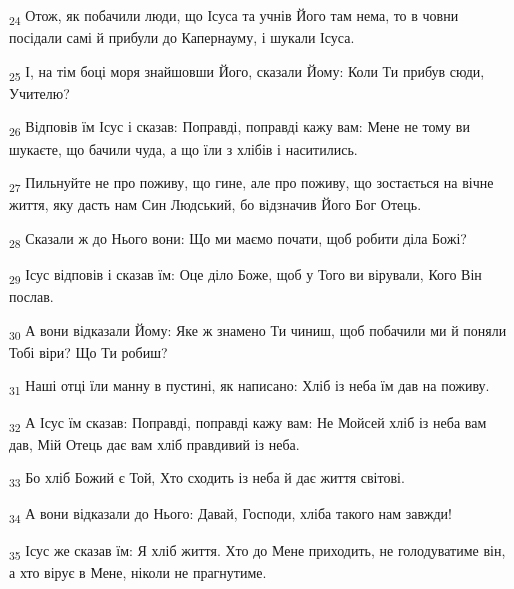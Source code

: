 \begin{tcolorbox}
\textsubscript{24} Отож, як побачили люди, що Ісуса та учнів Його там нема, то в човни посідали самі й прибули до Капернауму, і шукали Ісуса.
\end{tcolorbox}
\begin{tcolorbox}
\textsubscript{25} І, на тім боці моря знайшовши Його, сказали Йому: Коли Ти прибув сюди, Учителю?
\end{tcolorbox}
\begin{tcolorbox}
\textsubscript{26} Відповів їм Ісус і сказав: Поправді, поправді кажу вам: Мене не тому ви шукаєте, що бачили чуда, а що їли з хлібів і наситились.
\end{tcolorbox}
\begin{tcolorbox}
\textsubscript{27} Пильнуйте не про поживу, що гине, але про поживу, що зостається на вічне життя, яку дасть нам Син Людський, бо відзначив Його Бог Отець.
\end{tcolorbox}
\begin{tcolorbox}
\textsubscript{28} Сказали ж до Нього вони: Що ми маємо почати, щоб робити діла Божі?
\end{tcolorbox}
\begin{tcolorbox}
\textsubscript{29} Ісус відповів і сказав їм: Оце діло Боже, щоб у Того ви вірували, Кого Він послав.
\end{tcolorbox}
\begin{tcolorbox}
\textsubscript{30} А вони відказали Йому: Яке ж знамено Ти чиниш, щоб побачили ми й поняли Тобі віри? Що Ти робиш?
\end{tcolorbox}
\begin{tcolorbox}
\textsubscript{31} Наші отці їли манну в пустині, як написано: Хліб із неба їм дав на поживу.
\end{tcolorbox}
\begin{tcolorbox}
\textsubscript{32} А Ісус їм сказав: Поправді, поправді кажу вам: Не Мойсей хліб із неба вам дав, Мій Отець дає вам хліб правдивий із неба.
\end{tcolorbox}
\begin{tcolorbox}
\textsubscript{33} Бо хліб Божий є Той, Хто сходить із неба й дає життя світові.
\end{tcolorbox}
\begin{tcolorbox}
\textsubscript{34} А вони відказали до Нього: Давай, Господи, хліба такого нам завжди!
\end{tcolorbox}
\begin{tcolorbox}
\textsubscript{35} Ісус же сказав їм: Я хліб життя. Хто до Мене приходить, не голодуватиме він, а хто вірує в Мене, ніколи не прагнутиме.
\end{tcolorbox}
